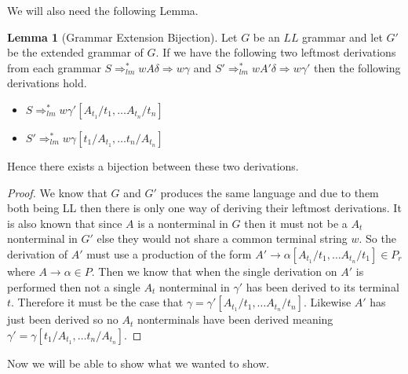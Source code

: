 \documentclass[a4paper,12pt]{article}
\theoremstyle{definition}
\newtheorem{lemma}{Lemma}[section]
\begin{document}
We will also need the following Lemma.
\begin{lemma}[Grammar Extension Bijection]\label{lemma:geb}
  Let $G$ be an $LL$ grammar and let $G'$ be the extended grammar of $G$. If we have the following two leftmost derivations from each grammar $S \Rightarrow_{lm}^* wA\delta \Rightarrow w\gamma$ and $S'\Rightarrow_{lm}^* wA'\delta \Rightarrow w\gamma'$ then the following derivations hold.
  \begin{itemize}
    \item $S \Rightarrow_{lm}^* w\gamma'[A_{t_1}/t_1, \dots A_{t_n}/t_n]$
    \item $S' \Rightarrow_{lm}^* w\gamma[t_1/A_{t_1}, \dots t_n/A_{t_n}]$
  \end{itemize}
  Hence there exists a bijection between these two derivations.
\end{lemma}
\begin{proof}
  We know that $G$ and $G'$ produces the same language and due to them both being LL then there is only one way of deriving their leftmost derivations. It is also known that since $A$ is a nonterminal in $G$ then it must not be a $A_t$ nonterminal in $G'$ else they would not share a common terminal string $w$. So the derivation of $A'$ must use a production of the form $A' \to \alpha[A_{t_1}/t_1, \dots A_{t_n}/t_1] \in P_r$ where $A \to \alpha \in P$. Then we know that when the single derivation on $A'$ is performed then not a single $A_t$ nonterminal in $\gamma'$ has been derived to its terminal $t$. Therefore it must be the case that $\gamma = \gamma'[A_{t_1}/t_1, \dots A_{t_n}/t_n]$. Likewise $A'$ has just been derived so no $A_t$ nonterminals have been derived meaning $\gamma' = \gamma[t_1/A_{t_1}, \dots t_n/A_{t_n}]$.
\end{proof}
Now we will be able to show what we wanted to show.
\end{document}
